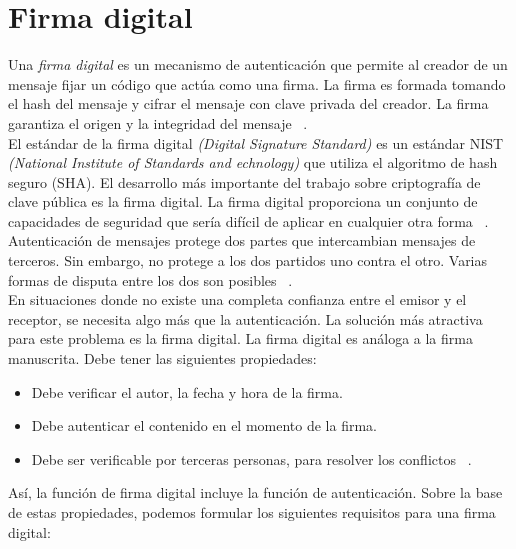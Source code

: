 

\section{Firma digital}

Una \textit{firma digital} es un mecanismo de autenticación que permite al creador de un mensaje fijar un código que actúa como una firma. La firma es formada tomando el hash del mensaje y cifrar el mensaje con clave privada del creador. La firma garantiza el origen y la integridad del mensaje ~\cite{modes}. \\
El estándar de la firma digital \textit{(Digital Signature Standard)} es un estándar NIST \textit{(National Institute of Standards and echnology)} que utiliza el algoritmo de hash seguro (SHA). El desarrollo más importante del trabajo sobre criptografía de clave pública es la firma digital. La firma digital proporciona un conjunto de capacidades de seguridad que sería difícil de aplicar en cualquier otra forma ~\cite{modes}. \\
Autenticación de mensajes protege dos partes que intercambian mensajes de terceros. Sin embargo, no protege a los dos partidos uno contra el otro. Varias formas de disputa entre los dos son posibles ~\cite{modes}. \\
En situaciones donde no existe una completa confianza entre el emisor y el receptor, se necesita algo más que la autenticación. La solución más atractiva para este problema es la firma digital. La firma digital es análoga a la firma manuscrita. Debe tener las siguientes propiedades:

	\begin{itemize}
		\item Debe verificar el autor, la fecha y hora de la firma.
		\item Debe autenticar el contenido en el momento de la firma.
		\item Debe ser verificable por terceras personas, para resolver los conflictos ~\cite{modes}.
	\end{itemize}

Así, la función de firma digital incluye la función de autenticación.
Sobre la base de estas propiedades, podemos formular los siguientes requisitos para una firma digital:

